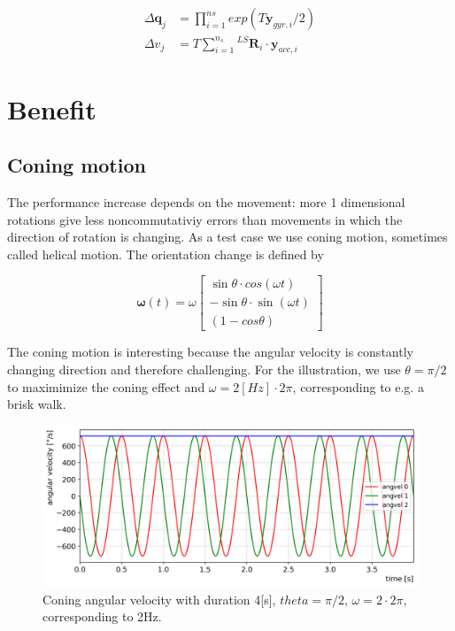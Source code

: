 \documentclass{article}
\begin{document}
\begin{equation} \label{eq:deltas}
\begin{aligned}
\Delta \boldsymbol{q}_j &= \prod_{i=1}^{ns} exp(T\boldsymbol{y}_{gyr,i}/2)\\
\Delta v_j &=  T \sum_{i=1}^{n_s} {}^{LS}\boldsymbol{R}_i \cdot \boldsymbol{y}_{acc,i} 
\end{aligned}
\end{equation}

\section{Benefit}

\subsection{Coning motion}
The performance increase depends on the movement: more 1 dimensional rotations give less noncommutativiy errors than movements in which the direction of rotation is changing. As a test case we use coning motion, sometimes called helical motion. The orientation change is defined by 

\begin{equation} \label{eq:coning_angular_velocity}
\boldsymbol{\omega}(t) = \omega \begin{bmatrix}
\sin \theta \cdot cos(\omega t) \\
-\sin \theta \cdot \sin(\omega t) \\
 (1 - cos \theta)
\end{bmatrix}
\end{equation}

The coning motion is interesting because the angular velocity is constantly changing direction and therefore challenging. For the illustration, we use $\theta=\pi /2$ to maximimize the coning effect and  $\omega=2[Hz] \cdot 2\pi$, corresponding to e.g. a brisk walk.

\begin{figure}[ht]
\includegraphics[width=.9\textwidth]{angular_velocity_coning.png} 
\caption{Coning angular velocity with duration 4[s], $theta=\pi /2$, $\omega=2\cdot 2 \pi$, corresponding to 2Hz.}
\centering
\end{figure}
\end{document}
